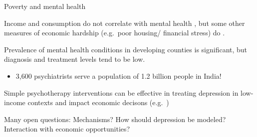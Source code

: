 \documentclass[aspectratio=169, 10pt, handout]{beamer}
\newenvironment{wideitemize}{\itemize\addtolength{\itemsep}{10pt}}{\enditemize}
\begin{document}
\begin{frame}{Poverty and mental health}

\begin{wideitemize}

	\item Income and consumption do not correlate with mental health \citep{das2007mental}, but some other measures of economic hardship (e.g.\ poor housing/ financial stress) do \citep{patel2003poverty,lund2010poverty}.
	
	\item Prevalence of mental health conditions in developing counties is significant, but diagnosis and treatment levels tend to be low. 
	
	\begin{itemize}
	    
	    \item 3,600 psychiatrists serve a population of 1.2 billion people in India!
	    
	\end{itemize}

	\item Simple psychotherapy interventions can be effective in treating depression in low-income contexts \citep{bolton2003group,patel2017healthy} and impact economic decisons (e.g.\ \cite{baranov2017maternal})
	
	\item Many open questions: Mechanisms? How should depression be modeled? Interaction with economic opportunities?

\end{wideitemize}


\end{frame}
\end{document}
